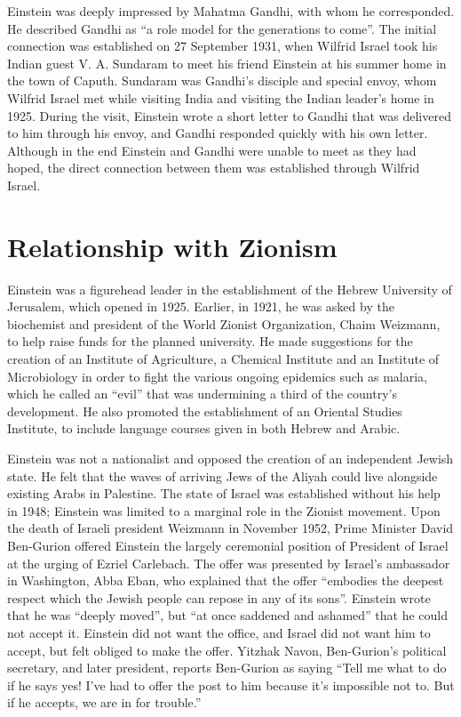 \documentclass[twoside]{memoir}
\begin{document}
Einstein was deeply impressed by Mahatma Gandhi,   with whom he corresponded. He described Gandhi as \enquote{a role model for the generations to come}. The initial connection was established on 27 September 1931, when Wilfrid Israel took his Indian guest V. A. Sundaram to meet his friend Einstein at his summer home in the town of Caputh. Sundaram was Gandhi's disciple and special envoy, whom Wilfrid Israel met while visiting India and visiting the Indian leader's home in 1925.  During the visit, Einstein wrote a short letter to Gandhi that was delivered to him through his envoy, and Gandhi responded quickly with his own letter. Although in the end Einstein and Gandhi were unable to meet as they had hoped, the direct connection between them was established through Wilfrid Israel.

\section{Relationship with Zionism}\label{relationship-with-zionism}

Einstein was a figurehead leader in the establishment of the Hebrew University of Jerusalem, which opened in 1925. Earlier, in 1921, he was asked by the biochemist and president of the World Zionist Organization,  Chaim Weizmann, to help raise funds for the planned university. He made suggestions for the creation of an Institute of Agriculture, a Chemical Institute and an Institute of Microbiology in order to fight the various ongoing epidemics such as malaria, which he called an \enquote{evil} that was undermining a third of the country's development. He also promoted the establishment of an Oriental Studies Institute, to include language courses given in both Hebrew and Arabic.

Einstein was not a nationalist and opposed the creation of an independent Jewish state. He felt that the waves of arriving Jews of the Aliyah could live alongside existing Arabs in Palestine. The state of Israel was established without his help in 1948; Einstein was limited to a marginal role in the Zionist movement. Upon the death of Israeli president Weizmann in November 1952, Prime Minister David Ben-Gurion  offered Einstein the largely ceremonial position of President of Israel at the urging of Ezriel Carlebach. The offer was presented by Israel's ambassador in Washington, Abba Eban, who explained that the offer \enquote{embodies the deepest respect which the Jewish people can repose in any of its sons}. Einstein wrote that he was \enquote{deeply moved}, but \enquote{at once saddened and ashamed} that he could not accept it. Einstein did not want the office, and Israel did not want him to accept, but felt obliged to make the offer. Yitzhak Navon, Ben-Gurion's political secretary, and later president, reports Ben-Gurion as saying \enquote{Tell me what to do if he says yes! I've had to offer the post to him because it's impossible not to. But if he accepts, we are in for trouble.}
\end{document}
